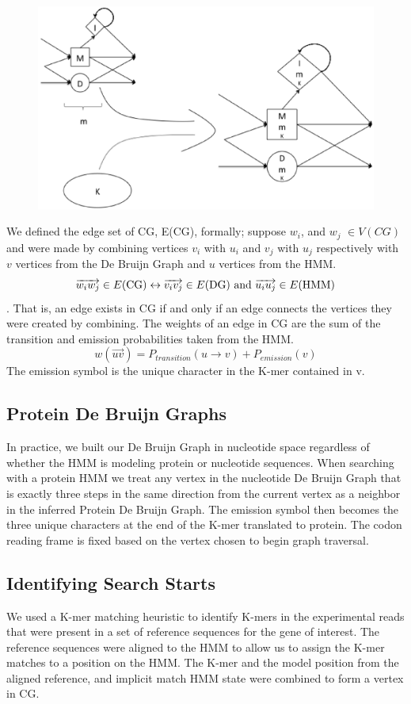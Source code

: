 \documentclass{article}
\begin{document}
\begin{figure}
\includegraphics[width=117mm]{combined_graph.eps}
\end{figure}
We defined the edge set of CG, E(CG), formally; suppose $w_i$, and $w_j$ \(\in V(CG) \) and were made by combining vertices $v_i$ with $u_i$ and $v_j$ with $u_j$ respectively with $v$ vertices from the De Bruijn Graph and $u$ vertices from the HMM.
\[\overrightarrow{w_iw_j} \in E(\textnormal{CG}) \leftrightarrow \overrightarrow{v_iv_j} \in 
E(\textnormal{DG})\textnormal{ and } \overrightarrow{u_iu_j} \in E(\textnormal{HMM})\].
That is, an edge exists in CG if and only if an edge connects the vertices they were created by combining.
The weights of an edge  in CG are the sum of the transition and emission probabilities taken from the HMM.  
\[ w(\overrightarrow{uv}) = P_{transition}(u \rightarrow v) + P_{emission}(v) \]
The emission symbol is the unique character in the K-mer contained in v.

\subsection{Protein De Bruijn Graphs}
In practice, we built our De Bruijn Graph in nucleotide space regardless of whether the HMM is modeling protein or nucleotide sequences.  When searching with a protein HMM we treat any vertex in the nucleotide De Bruijn Graph that is exactly three steps in the same direction from the current vertex as a neighbor in the inferred Protein De Bruijn Graph.  The emission symbol then becomes the three unique characters at the end of the K-mer translated to protein.  The codon reading frame is fixed based on the vertex chosen to begin graph traversal.

\subsection{Identifying Search Starts}
We used a K-mer matching heuristic to identify K-mers in the experimental reads that were present in a set of reference sequences for the gene of interest.  The reference sequences were aligned to the HMM to allow us to assign the K-mer matches to a position on the HMM.  The K-mer and the model position from the aligned reference, and implicit match HMM state were combined to form a vertex in CG.
\end{document}
